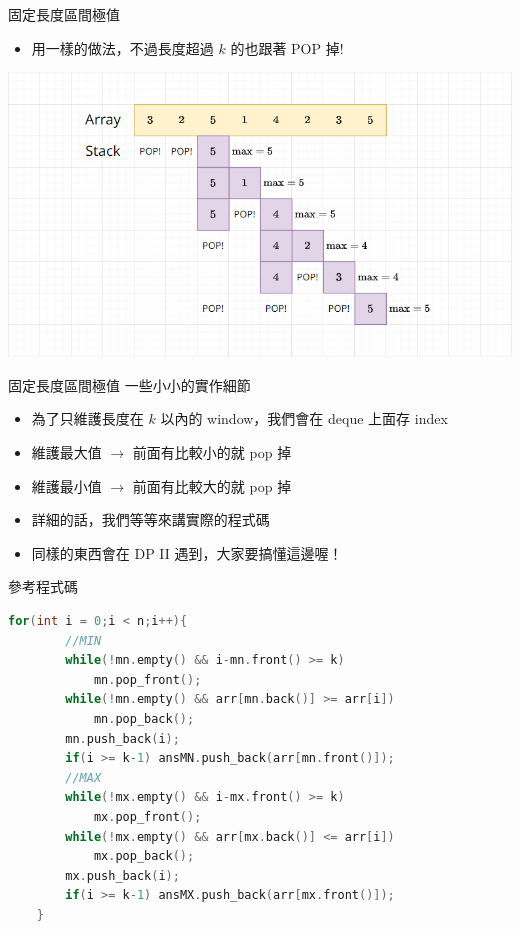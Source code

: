 \documentclass[aspectratio=169]{beamer}
\begin{document}
    \begin{frame}[fragile]{固定長度區間極值}
        \begin{itemize}
            \item 用一樣的做法，不過長度超過 $k$ 的也跟著 POP 掉!
        \end{itemize}
        \begin{center}
            \includegraphics[scale=0.45]{images/sliding_max.png}
        \end{center}
    \end{frame}
    
    \begin{frame}[fragile]{固定長度區間極值}
        一些小小的實作細節
        \begin{itemize}
            \item 為了只維護長度在 $k$ 以內的 window，我們會在 deque 上面存 index
            \item 維護最大值 $\rightarrow$ 前面有比較小的就 pop 掉
            \item 維護最小值 $\rightarrow$ 前面有比較大的就 pop 掉
            \item 詳細的話，我們等等來講實際的程式碼
            \item 同樣的東西會在 DP II 遇到，大家要搞懂這邊喔！
        \end{itemize}
    \end{frame}
    
    \begin{frame}[fragile]{參考程式碼}
        \begin{lstlisting}[language=C++,basicstyle=\ttfamily \small]
    for(int i = 0;i < n;i++){
        //MIN
        while(!mn.empty() && i-mn.front() >= k)
            mn.pop_front();
        while(!mn.empty() && arr[mn.back()] >= arr[i])
            mn.pop_back();
        mn.push_back(i);
        if(i >= k-1) ansMN.push_back(arr[mn.front()]);
        //MAX
        while(!mx.empty() && i-mx.front() >= k)
            mx.pop_front();
        while(!mx.empty() && arr[mx.back()] <= arr[i])
            mx.pop_back();
        mx.push_back(i);
        if(i >= k-1) ansMX.push_back(arr[mx.front()]);
    }
        \end{lstlisting}
    \end{frame}
    
\end{document}
